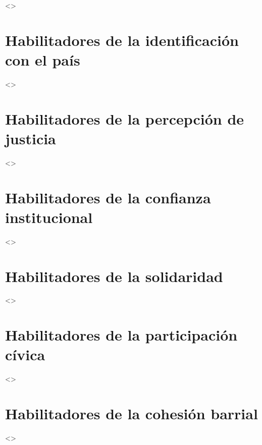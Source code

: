 \documentclass[
  12pt,
]{book}
\begin{document}
\textless{}\textgreater{}

\hypertarget{habilitadores-de-la-identificaciuxf3n-con-el-pauxeds}{%
\section{Habilitadores de la identificación con el país}\label{habilitadores-de-la-identificaciuxf3n-con-el-pauxeds}}

\textless{}\textgreater{}

\hypertarget{habilitadores-de-la-percepciuxf3n-de-justicia}{%
\section{Habilitadores de la percepción de justicia}\label{habilitadores-de-la-percepciuxf3n-de-justicia}}

\textless{}\textgreater{}

\hypertarget{habilitadores-de-la-confianza-institucional}{%
\section{Habilitadores de la confianza institucional}\label{habilitadores-de-la-confianza-institucional}}

\textless{}\textgreater{}

\hypertarget{habilitadores-de-la-solidaridad}{%
\section{Habilitadores de la solidaridad}\label{habilitadores-de-la-solidaridad}}

\textless{}\textgreater{}

\hypertarget{habilitadores-de-la-participaciuxf3n-cuxedvica}{%
\section{Habilitadores de la participación cívica}\label{habilitadores-de-la-participaciuxf3n-cuxedvica}}

\textless{}\textgreater{}

\hypertarget{habilitadores-de-la-cohesiuxf3n-barrial}{%
\section{Habilitadores de la cohesión barrial}\label{habilitadores-de-la-cohesiuxf3n-barrial}}

\textless{}\textgreater{}
\end{document}
